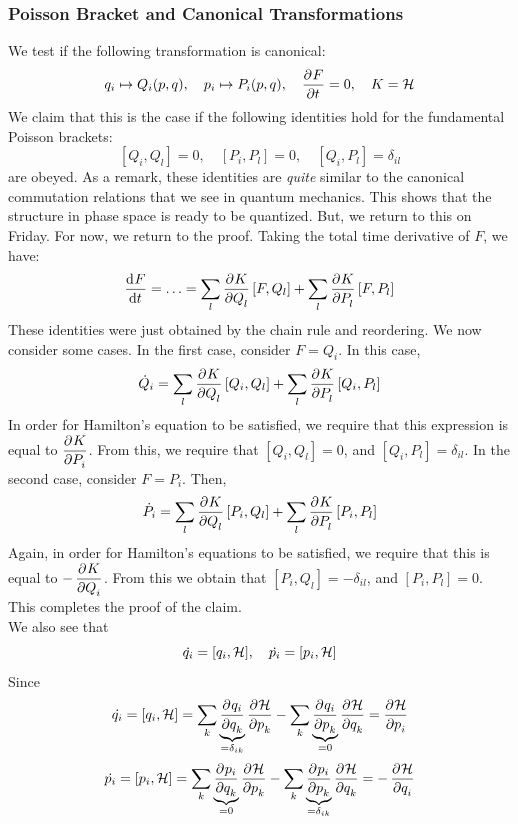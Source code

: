 \subsubsection{Poisson Bracket and Canonical Transformations}
We test if the following transformation is canonical:
\[q_i \mapsto Q_i(p, q), \quad p_i \mapsto P_i(p, q), \quad \dpd{F}{t} = 0, \quad K = \HH\]
We claim that this is the case if the following identities hold for the fundamental Poisson brackets:
\[[Q_i, Q_l] = 0, \quad [P_i, P_l] = 0, \quad [Q_i, P_l] = \delta_{il}\]
are obeyed. As a remark, these identities are \textit{quite} similar to the canonical commutation relations that we see in quantum mechanics. This shows that the structure in phase space is ready to be quantized. But, we return to this on Friday. For now, we return to the proof. Taking the total time derivative of $F$, we have:
\[\dod{F}{t} = \ldots = \sum_l \dpd{K}{Q_l}[F, Q_l] + \sum_l \dpd{K}{P_l}[F, P_l]\]
These identities were just obtained by the chain rule and reordering. We now consider some cases. In the first case, consider $F = Q_i$. In this case,
\[\dot{Q}_i = \sum_l\dpd{K}{Q_l}[Q_i, Q_l] + \sum_l\dpd{K}{P_l}[Q_i, P_l]\]
In order for Hamilton's equation to be satisfied, we require that this expression is equal to $\dpd{K}{P_i}$. From this, we require that $[Q_i, Q_l] = 0$, and $[Q_i, P_l] = \delta_{il}$. In the second case, consider $F =P_i$. Then,
\[\dot{P}_i = \sum_l\dpd{K}{Q_l}[P_i, Q_l] + \sum_l\dpd{K}{P_l}[P_i, P_l]\]
Again, in order for Hamilton's equations to be satisfied, we require that this is equal to $-\dpd{K}{Q_i}$. From this we obtain that $[P_i, Q_l] = -\delta_{il}$, and $[P_i, P_l] = 0$. This completes the proof of the claim. \\
We also see that
\[\dot{q_i}=[q_i, \mathcal{H}], \quad \dot{p_i}=[p_i, \mathcal{H}]\]
Since
\[\dot{q_i}=[q_i, \HH]=\sum_k \underbrace{\dpd{q_i}{q_k}}_{=\delta_{ik}} \dpd{\HH}{p_k}-\sum_k \underbrace{\dpd{q_i}{p_k}}_{=0} \dpd{\HH}{q_k}=\dpd{\HH}{p_i}\]
\[\dot{p_i}=[p_i, \HH]=\sum_k \underbrace{\dpd{p_i}{q_k}}_{=0} \dpd{\HH}{p_k}-\sum_k \underbrace{\dpd{p_i}{p_k}}_{=\delta_{ik}} \dpd{\HH}{q_k}=-\dpd{\HH}{q_i}\]

